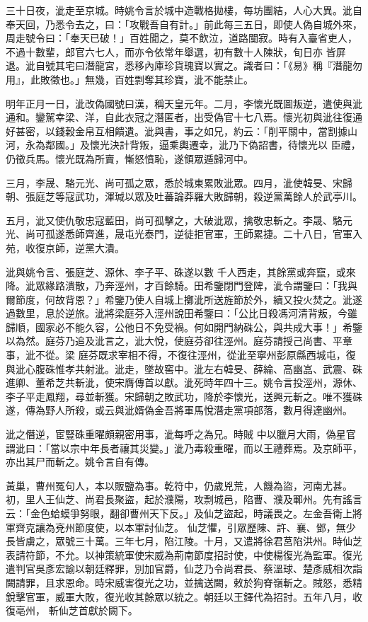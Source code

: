 \begin{pinyinscope}
 三十日夜，泚走至京城。時姚令言於城中造戰格拋樓，每坊團結，人心大異。泚自奉天回，乃悉令去之，曰：「攻戰吾自有計。」前此每三五日，即使人偽自城外來，周走號令曰：「奉天已破！」百姓聞之，莫不飲泣，道路闃寂。時有入臺省吏人，不過十數輩，郎官六七人，而亦令依常年舉選，初有數十人陳狀，旬日亦
 皆屏退。泚自號其宅曰潛龍宮，悉移內庫珍貨瑰寶以實之。識者曰：「《易》稱『潛龍勿用』，此敗徵也。」無幾，百姓剽奪其珍寶，泚不能禁止。



 明年正月一日，泚改偽國號曰漢，稱天皇元年。二月，李懷光既圖叛逆，遣使與泚通和。鑾駕幸梁、洋，自此衣冠之潛匿者，出受偽官十七八焉。懷光初與泚往復通好甚密，以錢穀金帛互相饋遺。泚與書，事之如兄，約云：「削平關中，當割據山河，永為鄰國。」及懷光決計背叛，逼乘輿遷幸，泚乃下偽詔書，待懷光以
 臣禮，仍徵兵馬。懷光既為所賣，慚怒憤恥，遂領眾遁歸河中。



 三月，李晟、駱元光、尚可孤之眾，悉於城東累敗泚眾。四月，泚使韓旻、宋歸朝、張庭芝等寇武功，渾瑊以眾及吐蕃論莽羅大敗歸朝，殺逆黨萬餘人於武亭川。



 五月，泚又使仇敬忠寇藍田，尚可孤擊之，大破泚眾，擒敬忠斬之。李晟、駱元光、尚可孤遂悉師齊進，晟屯光泰門，逆徒拒官軍，王師累捷。二十八日，官軍入苑，收復京師，逆黨大潰。



 泚與姚令言、張庭芝、源休、李子平、硃遂以數
 千人西走，其餘黨或奔竄，或來降。泚眾緣路潰散，乃奔涇州，才百餘騎。田希鑒閉門登陴，泚令謂鑒曰：「我與爾節度，何故背恩？」希鑒乃使人自城上擲泚所送旌節於外，續又投火焚之。泚遂過數里，息於逆旅。泚將梁庭芬入涇州說田希鑒曰：「公比日殺馮河清背叛，今雖歸順，國家必不能久容，公他日不免受禍。何如開門納硃公，與共成大事！」希鑒以為然。庭芬乃追及泚言之，泚大悅，使庭芬卻往涇州。庭芬請授己尚書、平章事，泚不從。梁
 庭芬既求宰相不得，不復往涇州，從泚至寧州彭原縣西城屯，復與泚心腹硃惟孝共射泚。泚走，墜故窖中。泚左右韓旻、薛綸、高幽嵓、武震、硃進卿、董希芝共斬泚，使宋膺傳首以獻。泚死時年四十三。姚令言投涇州，源休、李子平走鳳翔，尋並斬獲。宋歸朝之敗武功，降於李懷光，送興元斬之。唯不獲硃遂，傳為野人所殺，或云與泚婿偽金吾將軍馬悅潛走黨項部落，數月得達幽州。



 泚之僭逆，宦豎硃重曜頗親密用事，泚每呼之為兄。時賊
 中以臘月大雨，偽星官謂泚曰：「當以宗中年長者禳其災變。」泚乃毒殺重曜，而以王禮葬焉。及京師平，亦出其尸而斬之。姚令言自有傳。



 黃巢，曹州冤句人，本以販鹽為事。乾符中，仍歲兇荒，人饑為盜，河南尤甚。初，里人王仙芝、尚君長聚盜，起於濮陽，攻剽城邑，陷曹、濮及鄆州。先有謠言云：「金色蛤蟆爭努眼，翻卻曹州天下反。」及仙芝盜起，時議畏之。左金吾衛上將軍齊克讓為兗州節度使，以本軍討仙芝。
 仙芝懼，引眾歷陳、許、襄、鄧，無少長皆虜之，眾號三十萬。三年七月，陷江陵。十月，又遣將徐君莒陷洪州。時仙芝表請符節，不允。以神策統軍使宋威為荊南節度招討使，中使楊復光為監軍。復光遣判官吳彥宏諭以朝廷釋罪，別加官爵，仙芝乃令尚君長、蔡溫球、楚彥威相次詣闕請罪，且求恩命。時宋威害復光之功，並擒送闕，敕於狗脊嶺斬之。賊怒，悉精銳擊官軍，威軍大敗，復光收其餘眾以統之。朝廷以王鐸代為招討。五年八月，收復亳州，
 斬仙芝首獻於闕下。




\end{pinyinscope}
